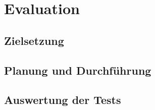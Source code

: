 \chapter{Evaluation}

\section{Zielsetzung}

\section{Planung und Durchführung}

\section{Auswertung der Tests}

